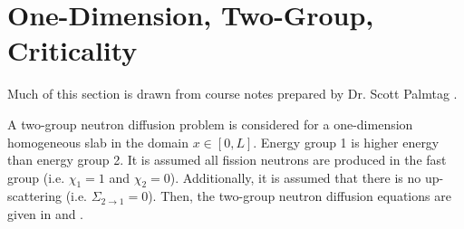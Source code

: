 \section{One-Dimension, Two-Group, Criticality}
  \label{sec:deriv_1d2g}
  Much of this section is drawn from course notes prepared by Dr. Scott 
  Palmtag \cite{analytic2g}.
  
  A two-group neutron diffusion problem is considered for a one-dimension
  homogeneous slab in the domain $x \in [0,L]$. Energy group 1 is higher energy
  than energy group 2. It is assumed all fission neutrons are  produced in the
  fast group (i.e. $\chi_1=1$ and $\chi_2=0$). Additionally, it is assumed that 
  there is no up-scattering  (i.e. $\Sigma_{2\rightarrow1}=0$).  Then, the
  two-group neutron diffusion equations are given in  and 
  .
  
